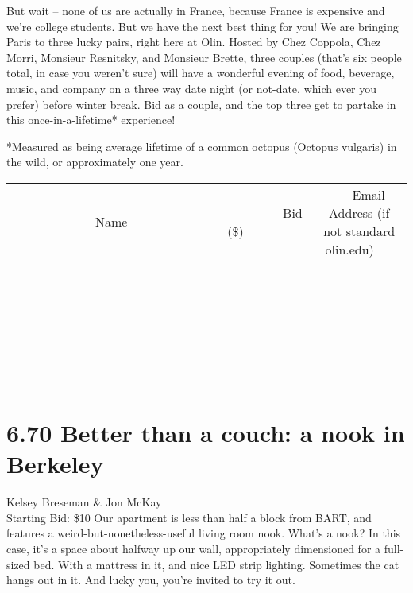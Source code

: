 \documentclass[11pt]{article}
\begin{document}
But wait – none of us are actually in France, because France is expensive and we’re college students. But we have the next best thing for you! We are bringing Paris to three lucky pairs, right here at Olin. Hosted by Chez Coppola, Chez Morri, Monsieur Resnitsky, and Monsieur Brette, three couples (that’s six people total, in case you weren't sure) will have a wonderful evening of food, beverage, music, and company on a three way date night (or not-date, which ever you prefer) before winter break. Bid as a couple, and the top three get to partake in this once-in-a-lifetime* experience!

*Measured as being average lifetime of a common octopus (Octopus vulgaris) in the wild, or approximately one year.
\\[6ex]
\begin{tabular}{c c c}
~~~~~~~~~~~~~Name~~~~~~~~~~~~~ & ~~~~~~~~~Bid (\$)~~~~~~~~~  & ~~~Email Address (if not standard olin.edu)~~~\\
 & & \\
\hline
 & & \\
\hline
 & & \\
\hline
 & & \\
\hline
 & & \\
\hline
 & & \\
\hline
 & & \\
\hline
 & & \\
\hline
 & & \\
\hline
 & & \\
\hline
 & & \\
\hline
 & & \\
\hline
 & & \\
\hline
 & & \\
\hline
 & & \\
\hline
 & & \\
\hline
 & & \\
\hline
 & & \\
\hline
 & & \\
\hline
 & & \\
\hline
 & & \\
\hline
 & & \\
\hline
 & & \\
\hline
 & & \\
\hline
 & & \\
\hline
 & & \\
\hline
\end{tabular}
\newpage
\section*{6.70 Better than a couch: a nook in Berkeley}
Kelsey Breseman \& Jon McKay
\\
Starting Bid: \$10
\newline
Our apartment is less than half a block from BART, and features a weird-but-nonetheless-useful living room nook. What's a nook? In this case, it's a space about halfway up our wall, appropriately dimensioned for a full-sized bed. With a mattress in it, and nice LED strip lighting. Sometimes the cat hangs out in it. And lucky you, you're invited to try it out.
\end{document}
